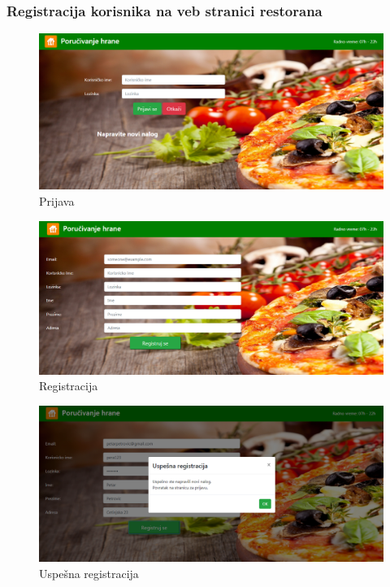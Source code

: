 \subsubsection{Registracija korisnika na veb stranici restorana}
\begin{figure}[!h]
    \includegraphics[width=1\textwidth]{slike/prijava_dijalog.png}
    \caption{Prijava}
    \label{fig:prijava}
\end{figure}
\begin{figure}[!h]
    \includegraphics[width=1\textwidth]{slike/registracija.png}
    \caption{Registracija}
    \label{fig:reg1}
\end{figure}
\begin{figure}[!h]
    \includegraphics[width=1\textwidth]{slike/uspesna_registracija.png}
    \caption{Uspe\v sna registracija}
    \label{fig:reg2}
\end{figure}
